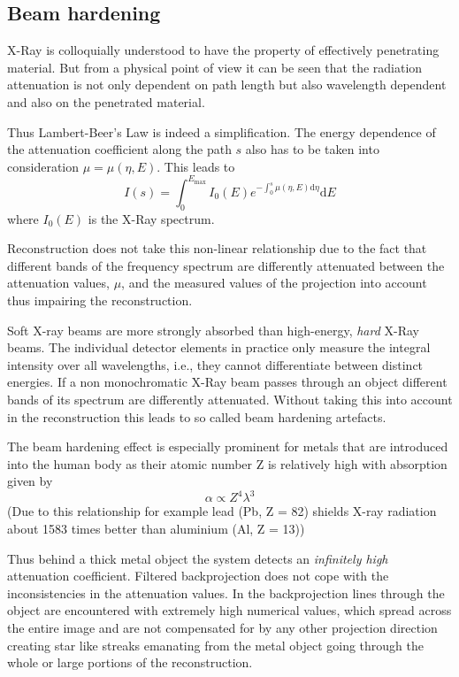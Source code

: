 \subsection{Beam hardening\cite{buzug}}
\par X-Ray is colloquially understood to have the property of effectively penetrating material. But from a physical point of view it can be seen that the radiation attenuation is not only dependent on path length but also wavelength dependent and also on the penetrated material.
\par Thus Lambert-Beer's Law is indeed a simplification. The energy dependence of the attenuation coefficient along the path \(s\) also has to be taken into consideration \(\mu = \mu(\eta,E)\). This leads to \[I(s) = \int_0^{E_{\textrm{max}}}I_0(E)e^{-\int_0^{s}\mu(\eta,E)\textrm{d}\eta}\textrm{d}E\] where \(I_0(E)\) is the X-Ray spectrum.
\par Reconstruction does not take this non-linear relationship due to the fact that different bands of the frequency spectrum are differently attenuated between the attenuation values, \(\mu\), and the measured values of the projection into account thus impairing the reconstruction.
\par Soft X-ray beams are more strongly absorbed than high-energy, \emph{hard} X-Ray beams. The individual detector elements in practice only measure the integral intensity over all wavelengths, i.e., they cannot differentiate between distinct energies. If a non monochromatic X-Ray beam passes through an object different bands of its spectrum are differently attenuated. Without taking this into account in the reconstruction this leads to so called beam hardening artefacts.
\par The beam hardening effect is especially prominent for metals that are introduced into the human body as their atomic number Z is relatively high with absorption given by \[\alpha \propto Z^4\lambda^3\] (Due to this relationship for example lead (Pb, Z = 82) shields X-ray radiation about 1583 times better than aluminium (Al, Z = 13))
\par Thus behind a thick metal object the system detects an \emph{infinitely high} attenuation coefficient. Filtered backprojection does not cope with the inconsistencies in the attenuation values. In the backprojection lines through the object are encountered with extremely high numerical values, which spread across the entire image and are not compensated for by any other projection direction creating star like streaks emanating from the metal object going through the whole or large portions of the reconstruction.\cite{buzug}
